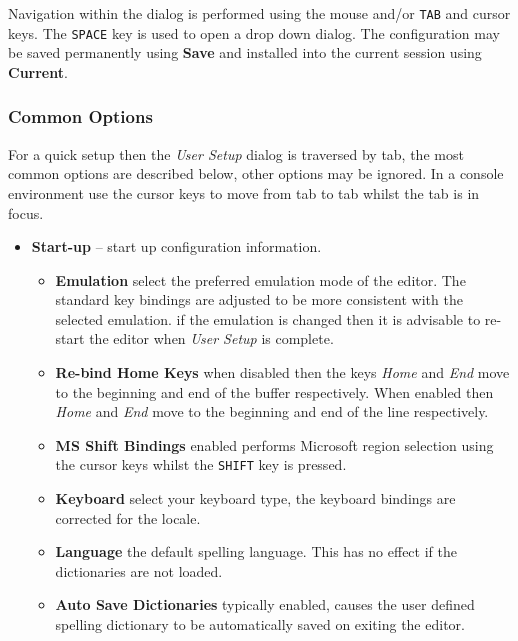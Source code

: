 \documentclass[11pt,a4paper,pdftex]{article}
\begin{document}
  Navigation within the dialog is performed using the mouse and/or
  \texttt{TAB} and cursor keys. The \texttt{SPACE} key is used to open a drop
  down dialog. The configuration may be saved permanently using \textbf{Save}
  and installed into the current session using \textbf{Current}.

\subsubsection{Common Options}

  For a quick setup then the \textit{User Setup} dialog is traversed by tab,
  the most common options are described below, other options may be ignored. 
  In a console environment use the cursor keys to move from tab to tab whilst 
  the tab is in focus.

  \begin{itemize}
    \item \textbf{Start-up} -- start up configuration information.

    \begin{itemize}

      \item \textbf{Emulation} select the preferred emulation mode of the
      editor. The standard key bindings are adjusted to be more consistent
      with the selected emulation. if the emulation is changed then it is
      advisable to re-start the editor when \textit{User Setup} is complete. 

      \item \textbf{Re-bind Home Keys} when disabled then the keys
      \textit{Home} and \textit{End} move to the beginning and end of the
      buffer respectively. When enabled then \textit{Home} and \textit{End}
      move to the beginning and end of the line respectively.

      \item \textbf{MS Shift Bindings} enabled performs Microsoft region
      selection using the cursor keys whilst the \texttt{SHIFT} key is
      pressed.

      \item \textbf{Keyboard} select your keyboard type, the keyboard bindings
      are corrected for the locale.

      \item \textbf{Language} the default spelling language. This has no
      effect if the dictionaries are not loaded.

      \item \textbf{Auto Save Dictionaries} typically enabled, causes the user
      defined spelling dictionary to be automatically saved on exiting the
      editor.


\end{itemize}
\end{itemize}
\end{document}
